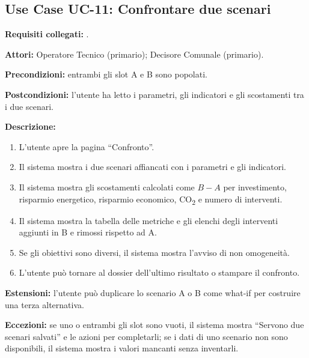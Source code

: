 \subsection*{Use Case UC-11: Confrontare due scenari}
\textbf{Requisiti collegati:} .\par
\textbf{Attori:} Operatore Tecnico (primario); Decisore Comunale (primario).\par
\textbf{Precondizioni:} entrambi gli slot A e B sono popolati.\par
\textbf{Postcondizioni:} l'utente ha letto i parametri, gli indicatori e gli scostamenti tra i due scenari.\par
\textbf{Descrizione:}
\begin{enumerate}[leftmargin=1.6em, itemsep=0.1em]
    \item L'utente apre la pagina ``Confronto''.
    \item Il sistema mostra i due scenari affiancati con i parametri e gli indicatori.
    \item Il sistema mostra gli scostamenti calcolati come $B - A$ per investimento, risparmio energetico, risparmio economico, CO\textsubscript{2} e numero di interventi.
    \item Il sistema mostra la tabella delle metriche e gli elenchi degli interventi aggiunti in B e rimossi rispetto ad A.
    \item Se gli obiettivi sono diversi, il sistema mostra l'avviso di non omogeneità.
    \item L'utente può tornare al dossier dell'ultimo risultato o stampare il confronto.
\end{enumerate}
\textbf{Estensioni:} l'utente può duplicare lo scenario A o B come what-if per costruire una terza alternativa.\par
\textbf{Eccezioni:} se uno o entrambi gli slot sono vuoti, il sistema mostra ``Servono due scenari salvati'' e le azioni per completarli; se i dati di uno scenario non sono disponibili, il sistema mostra i valori mancanti senza inventarli.

